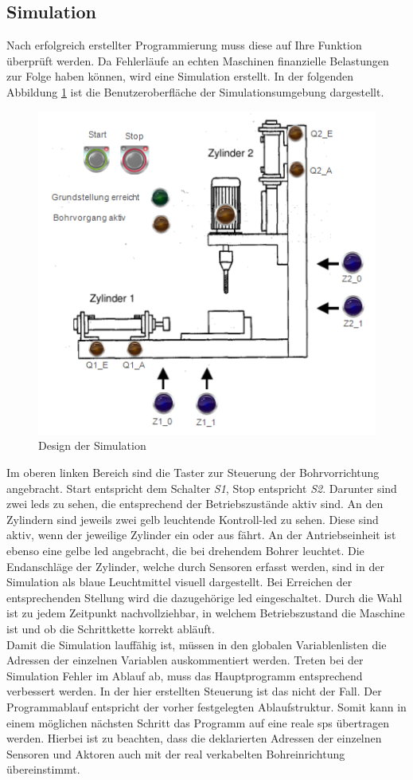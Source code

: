 \subsection{Simulation}
Nach erfolgreich erstellter Programmierung muss diese auf Ihre Funktion überprüft werden. Da Fehlerläufe an echten Maschinen finanzielle Belastungen zur Folge haben können, wird eine Simulation erstellt. In der folgenden Abbildung \ref{fig:Simulation} ist die Benutzeroberfläche der Simulationsumgebung dargestellt.
\begin{figure}[H]
   \centering
    \includegraphics[scale=1]{Bilder/Simulation_Design.png}
    \caption[Design der Simulation]{Design der Simulation \footnotemark}
    \label{fig:Simulation}
\end{figure}
Im oberen linken Bereich sind die Taster zur Steuerung der Bohrvorrichtung angebracht. Start entspricht dem Schalter \textit{S1}, Stop entspricht \textit{S2}. Darunter sind zwei \acp{led} zu sehen, die entsprechend der Betriebszustände aktiv sind. An den Zylindern sind jeweils zwei gelb leuchtende Kontroll-\ac{led} zu sehen. Diese sind aktiv, wenn der jeweilige Zylinder ein oder aus fährt. An der Antriebseinheit ist ebenso eine gelbe \ac{led} angebracht, die bei drehendem Bohrer leuchtet. Die Endanschläge der Zylinder, welche durch Sensoren erfasst werden, sind in der Simulation als blaue Leuchtmittel visuell dargestellt. Bei Erreichen der entsprechenden Stellung wird die dazugehörige \ac{led} eingeschaltet. Durch die Wahl ist zu jedem Zeitpunkt nachvollziehbar, in welchem Betriebszustand die Maschine ist und ob die Schrittkette korrekt abläuft.\\
Damit die Simulation lauffähig ist, müssen in den globalen Variablenlisten die Adressen der einzelnen Variablen auskommentiert werden. Treten bei der Simulation Fehler im Ablauf ab, muss das Hauptprogramm entsprechend verbessert werden. In der hier erstellten Steuerung ist das nicht der Fall. Der Programmablauf entspricht der vorher festgelegten Ablaufstruktur. Somit kann in einem möglichen nächsten Schritt das Programm auf eine reale \ac{sps} übertragen werden. Hierbei ist zu beachten, dass die deklarierten Adressen der einzelnen Sensoren und Aktoren auch mit der real verkabelten Bohreinrichtung übereinstimmt.